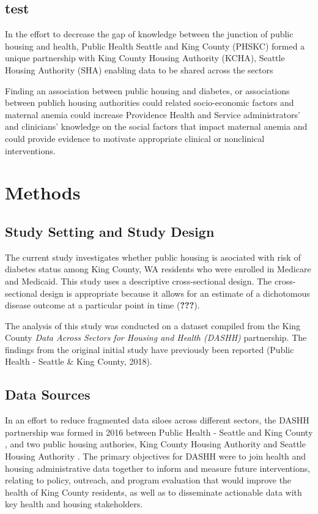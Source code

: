 \documentclass [11pt, proquest] {uwthesis}[2015/03/03]
\begin{document}
\section{test}\label{test}

In the effort to decrease the gap of knowledge between the junction of
public housing and health, Public Health Seattle and King County (PHSKC)
formed a unique partnership with King County Housing Authority (KCHA),
Seattle Housing Authority (SHA) enabling data to be shared across the
sectors

Finding an association between public housing and diabetes, or
associations between publich housing authorities could related
socio-economic factors and maternal anemia could increase Providence
Health and Service administrators' and clinicians' knowledge on the
social factors that impact maternal anemia and could provide evidence to
motivate appropriate clinical or nonclinical interventions.

\chapter{Methods}\label{math-sci}

\section{Study Setting and Study
Design}\label{study-setting-and-study-design}

The current study investigates whether public housing is asociated with
risk of diabetes status among King County, WA residents who were
enrolled in Medicare and Medicaid. This study uses a descriptive
cross-sectional design. The cross-sectional design is appropriate
because it allows for an estimate of a dichotomous disease outcome at a
particular point in time ({\textbf{???}}).

The analysis of this study was conducted on a dataset compiled from the
King County \emph{Data Across Sectors for Housing and Health (DASHH)}
partnership. The findings from the original initial study have
previously been reported (Public Health - Seattle \& King County, 2018).

\section{Data Sources}\label{data-sources}

In an effort to reduce fragmented data siloes across different sectors,
the DASHH partnership was formed in 2016 between Public Health - Seattle
and King County , and two public housing authories, King County Housing
Authority and Seattle Housing Authority . The primary objectives for
DASHH were to join health and housing administrative data together to
inform and measure future interventions, relating to policy, outreach,
and program evaluation that would improve the health of King County
residents, as well as to disseminate actionable data with key health and
housing stakeholders.
\end{document}
